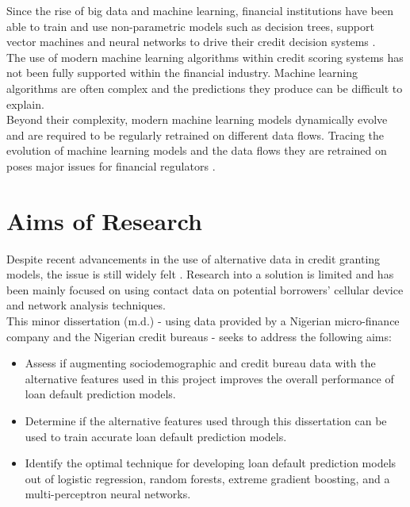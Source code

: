 Since the rise of big data and machine learning, financial institutions have been able to train and use non-parametric models such as decision trees, support vector machines and neural networks to drive their credit decision systems \parencite{IntroToCreditModelling}. \\

The use of modern machine learning algorithms within credit scoring systems has not been fully supported within the financial industry. Machine learning algorithms are often complex and the predictions they produce can be difficult to explain.  \\

Beyond their complexity, modern machine learning models dynamically evolve and are required to be regularly retrained on different data flows. Tracing the evolution of machine learning models and the data flows they are retrained on poses major issues for financial regulators \parencite{Regulation}. \\


\section{Aims of Research}

Despite recent advancements in the use of alternative data in credit granting models, the issue is still widely felt \parencite{BigDataMicroFiance}. Research into a solution is limited and has been mainly focused on using contact data on potential borrowers' cellular device and network analysis techniques. \\

This minor dissertation (m.d.) - using data provided by a Nigerian micro-finance company and the Nigerian credit bureaus - seeks to address the following aims:  

\begin{itemize}
    \item Assess if augmenting sociodemographic and credit bureau data with the alternative features used in this project improves the overall performance of loan default prediction models.
    \item Determine if the alternative features used through this dissertation can be used to train accurate loan default prediction models. 
    \item Identify the optimal technique for developing loan default prediction models out of logistic regression, random forests, extreme gradient boosting, and a multi-perceptron neural networks. 
\end{itemize}
    

